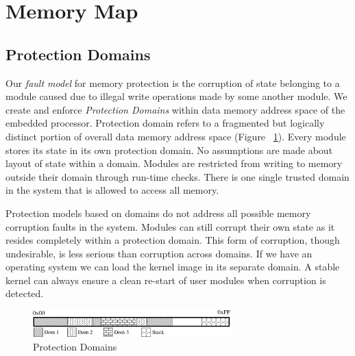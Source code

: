 \section{Memory Map}
\label{sec:memmap}
%
%
\subsection{Protection Domains}
%
Our \textit{fault model} for memory protection is the corruption of state belonging to a module caused due to illegal write operations made by some another module.
%
We create and enforce \emph{Protection Domains} within data memory address space of the embedded processor.
%
Protection domain refers to a fragmented but logically distinct portion of overall data memory address space (Figure ~\ref{fig:prot_domains}).
%
Every module stores its state in its own protection domain.
%
No assumptions are made about layout of state within a domain.
%
Modules are restricted from writing to memory outside their domain through run-time checks.
%
There is one single trusted domain in the system that is allowed to access all memory.
%

Protection models based on domains do not address all possible memory corruption faults in the system.
%
Modules can still corrupt their own state as it resides completely within a protection domain. 
%
This form of corruption, though undesirable, is less serious than corruption across domains.
%
If we have an operating system we can load the kernel image in its separate domain.
%
A stable kernel can always ensure a clean re-start of user modules when corruption is detected.
%
\begin{figure}[htbp]
   \centering
   \includegraphics[width = 3in, keepaspectratio=true]{figures/domains.eps} 
   \caption{Protection Domains}
   \label{fig:prot_domains}
\end{figure}
%

